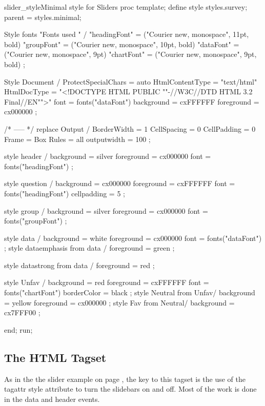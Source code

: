 \begin{fvcode}{slider_style}{Minimal style for Sliders}
proc template;
  define style styles.survey;
  parent = styles.minimal;
  
      Style fonts "Fonts used " /
      "headingFont" = ("Courier new, monospace", 11pt, bold)
      "groupFont" = ("Courier new, monospace", 10pt, bold)
      "dataFont" = ("Courier new, monospace", 9pt)
      "chartFont" = ("Courier new, monospace", 9pt, bold)
      ;

     Style Document /
        ProtectSpecialChars = auto
        HtmlContentType = "text/html"
        HtmlDocType = "<!DOCTYPE HTML PUBLIC ""-//W3C//DTD HTML 3.2 Final//EN"">"
        font = fonts("dataFont")
        background = cxFFFFFF
        foreground = cx000000
     ;

       /* ----- */
       replace Output /
          BorderWidth = 1
          CellSpacing = 0
          CellPadding = 0
          Frame = Box
          Rules = all
          outputwidth = 100%
       ;
      
      style header /
          background = silver
          foreground = cx000000
          font = fonts("headingFont")
      ;
          
      style question /
          background = cx000000
          foreground = cxFFFFFF
          font = fonts("headingFont")
          cellpadding = 5
      ;

      style group /
          background = silver
          foreground = cx000000
          font = fonts("groupFont")
      ;

      style data /
          background = white
          foreground = cx000000
          font = fonts("dataFont")
      ;
      style dataemphasis from data /
          foreground = green
      ;

      style datastrong from data /
          foreground = red
      ;
      
      style Unfav /
          background = red
          foreground = cxFFFFFF
          font = fonts("chartFont")
          borderColor = black
      ;
      style Neutral from Unfav/
          background = yellow
          foreground = cx000000
      ;
      style Fav from Neutral/
          background = cx7FFF00
      ;
        
      end;
run;
\end{fvcode}

\subsection{The HTML Tagset}
As in the the slider example on page \pageref{slider},
the key to this tagset is the use of the tagattr style attribute to turn the slidebars on
and off.  Most of the work is done in the data and header events.

